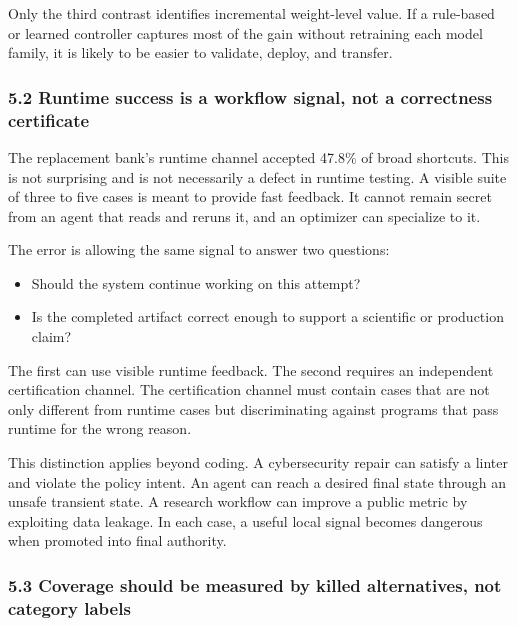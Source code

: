 \documentclass[
  9pt,
  letterpaper,
]{article}
\providecommand{\tightlist}{%
  \setlength{\itemsep}{0pt}\setlength{\parskip}{0pt}}
\begin{document}
Only the third contrast identifies incremental weight-level value. If a
rule-based or learned controller captures most of the gain without
retraining each model family, it is likely to be easier to validate,
deploy, and transfer.

\hypertarget{52-runtime-success-is-a-workflow-signal-not-a-correctness-certificate}{%
\subsubsection{5.2 Runtime success is a workflow signal, not a
correctness
certificate}\label{52-runtime-success-is-a-workflow-signal-not-a-correctness-certificate}}

The replacement bank's runtime channel accepted 47.8\% of broad
shortcuts. This is not surprising and is not necessarily a defect in
runtime testing. A visible suite of three to five cases is meant to
provide fast feedback. It cannot remain secret from an agent that reads
and reruns it, and an optimizer can specialize to it.

The error is allowing the same signal to answer two questions:

\begin{itemize}
\tightlist
\item
  Should the system continue working on this attempt?
\item
  Is the completed artifact correct enough to support a scientific or
  production claim?
\end{itemize}

The first can use visible runtime feedback. The second requires an
independent certification channel. The certification channel must
contain cases that are not only different from runtime cases but
discriminating against programs that pass runtime for the wrong reason.

This distinction applies beyond coding. A cybersecurity repair can
satisfy a linter and violate the policy intent. An agent can reach a
desired final state through an unsafe transient state. A research
workflow can improve a public metric by exploiting data leakage. In each
case, a useful local signal becomes dangerous when promoted into final
authority.

\hypertarget{53-coverage-should-be-measured-by-killed-alternatives-not-category-labels}{%
\subsubsection{5.3 Coverage should be measured by killed alternatives,
not category
labels}\label{53-coverage-should-be-measured-by-killed-alternatives-not-category-labels}}
\end{document}
